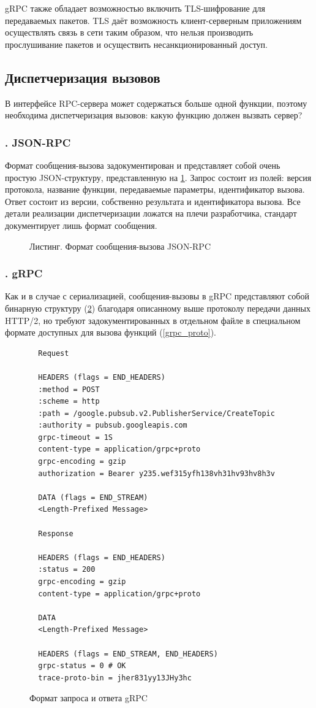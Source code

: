 \documentclass[a4paper,14pt,indentfirst]{extreport}
\begin{document}
\FloatBarrier
gRPC также обладает возможностью включить TLS-шифрование для передаваемых пакетов. TLS даёт возможность клиент-серверным приложениям осуществлять связь в сети таким образом, что нельзя производить прослушивание пакетов и осуществить несанкционированный доступ.
\subsection{Диспетчеризация вызовов}
В интерфейсе RPC-сервера может содержаться больше одной функции, поэтому необходима диспетчеризация вызовов: какую функцию должен вызвать сервер?
\subsubsection*{\thesubsubsection. JSON-RPC}
Формат сообщения-вызова задокументирован и представляет собой очень простую JSON-структуру, представленную на \cref{jsoncall}. Запрос состоит из полей: версия протокола, название функции, передаваемые параметры, идентификатор вызова. Ответ состоит из версии, собственно результата и идентификатора вызова. Все детали реализации диспетчеризации ложатся на плечи разработчика, стандарт документирует лишь формат сообщения.
\begin{figure}[H]
  
  \caption{Листинг. Формат сообщения-вызова JSON-RPC}
  \label{jsoncall}
\end{figure}
\subsubsection*{\thesubsubsection. gRPC}
Как и в случае с сериализацией, сообщения-вызовы в gRPC представляют собой бинарную структуру (\cref{grpc_call}) благодаря описанному выше протоколу передачи данных HTTP/2, но требуют задокументированных в отдельном файле в специальном формате доступных для вызова функций (\cref{grpc_proto}).
\begin{figure}[h]
\begin{lstlisting}
  Request

  HEADERS (flags = END_HEADERS)
  :method = POST
  :scheme = http
  :path = /google.pubsub.v2.PublisherService/CreateTopic
  :authority = pubsub.googleapis.com
  grpc-timeout = 1S
  content-type = application/grpc+proto
  grpc-encoding = gzip
  authorization = Bearer y235.wef315yfh138vh31hv93hv8h3v
  
  DATA (flags = END_STREAM)
  <Length-Prefixed Message>

  Response
  
  HEADERS (flags = END_HEADERS)
  :status = 200
  grpc-encoding = gzip
  content-type = application/grpc+proto
  
  DATA
  <Length-Prefixed Message>
  
  HEADERS (flags = END_STREAM, END_HEADERS)
  grpc-status = 0 # OK
  trace-proto-bin = jher831yy13JHy3hc
\end{lstlisting}
\caption{Формат запроса и ответа gRPC}
\label{grpc_call}
\end{figure}
\end{document}
